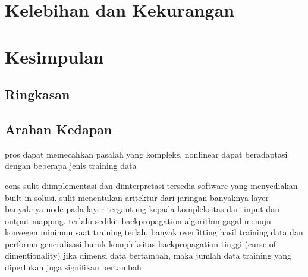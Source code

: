 
\section{Kelebihan dan Kekurangan}
\lipsum

\section{Kesimpulan}

	\subsection{Ringkasan}
	\lipsum[1]

	\subsection{Arahan Kedapan}
	\lipsum[1]


pros 
	dapat memecahkan pasalah yang kompleks, nonlinear
	dapat beradaptasi dengan beberapa jenis training data

cons 
sulit diimplementasi dan diinterpretasi
	tersedia software yang menyediakan built-in solusi.
sulit menentukan aritektur dari jaringan
	banyaknya layer
	banyaknya node pada layer
		tergantung kepada kompleksitas dari input dan output mapping. 
		terlalu sedikit backpropagation algorithm gagal menuju konvegen minimun saat training 
		terlalu banyak overfitting hasil training data dan performa generalisasi buruk
kompleksitas backpropagation tinggi (curse of dimentionality)
	jika dimensi data bertambah, maka jumlah data training yang diperlukan juga signifikan bertambah



